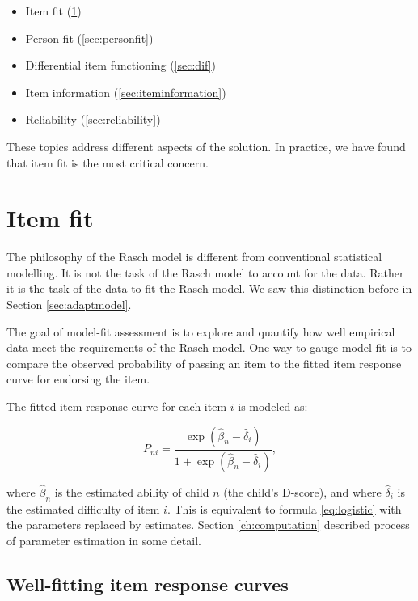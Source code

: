 \documentclass[
]{book}
\providecommand{\tightlist}{%
  \setlength{\itemsep}{0pt}\setlength{\parskip}{0pt}}
\begin{document}
\begin{itemize}
\tightlist
\item
  Item fit (\ref{sec:itemfit})
\item
  Person fit (\ref{sec:personfit})
\item
  Differential item functioning (\ref{sec:dif})
\item
  Item information (\ref{sec:iteminformation})
\item
  Reliability (\ref{sec:reliability})
\end{itemize}

These topics address different aspects of the solution. In practice, we have found that item fit is the most critical concern.

\hypertarget{sec:itemfit}{%
\section{Item fit}\label{sec:itemfit}}

The philosophy of the Rasch model is different from conventional statistical modelling. It is not the task of the Rasch model to account for the data. Rather it is the task of the data to fit the Rasch model. We saw this distinction before in Section \ref{sec:adaptmodel}.

The goal of model-fit assessment is to explore and quantify how well empirical data meet the requirements of the Rasch model. One way to gauge model-fit is to compare the observed probability of passing an item to the fitted item response curve for endorsing the item.

The fitted item response curve for each item \(i\) is modeled as:

\[P_{ni} = \frac{\exp(\hat\beta_{n} - \hat\delta_{i})}{1+\exp(\hat\beta_{n}-\hat\delta_{i})},\]

where \(\hat\beta_n\) is the estimated ability of child \(n\) (the child's D-score), and where \(\hat\delta_i\) is the estimated difficulty of item \(i\). This is equivalent to formula \eqref{eq:logistic} with the parameters replaced by estimates. Section \ref{ch:computation} described process of parameter estimation in some detail.

\hypertarget{well-fitting-item-response-curves}{%
\subsection{Well-fitting item response curves}\label{well-fitting-item-response-curves}}
\end{document}
